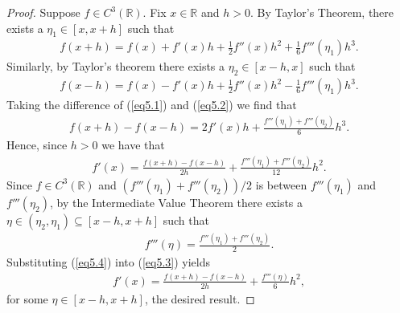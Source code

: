 \documentclass[8pt]{article}
\theoremstyle{definition}
\begin{document}
\begin{proof}
Suppose $f \in C^3 (\mathbb{R})$. Fix $x \in \mathbb{R}$ and $h > 0$. By Taylor's Theorem, there exists a $\eta_1 \in [x, x + h]$ such that
\begin{align}
f(x + h) = f(x) + f'(x) h + \frac{1}{2} f''(x) h^2 + \frac{1}{6} f'''(\eta_1) h^3. \label{eq5.1}
\end{align}
Similarly, by Taylor's theorem there exists a $\eta_2 \in [x - h, x]$ such that 
\begin{align}
f(x - h) = f(x) - f'(x) h + \frac{1}{2} f''(x) h^2 - \frac{1}{6} f'''(\eta_1) h^3. \label{eq5.2}
\end{align}
Taking the difference of (\ref{eq5.1}) and (\ref{eq5.2}) we find that 
\begin{align*}
f(x + h) - f(x - h) = 2 f'(x) h + \frac{f'''(\eta_1) + f'''(\eta_2)}{6} h^3.
\end{align*}
Hence, since $h > 0$ we have that
\begin{align}
f'(x) = \frac{f(x + h) - f(x - h)}{2h} + \frac{f'''(\eta_1) + f'''(\eta_2)}{12} h^2. \label{eq5.3}
\end{align}
Since $f \in C^3 (\mathbb{R})$ and $(f'''(\eta_1) + f'''(\eta_2))/2$ is between $f'''(\eta_1)$ and $f'''(\eta_2)$, by the Intermediate Value Theorem there exists a $\eta \in (\eta_2, \eta_1) \subseteq [x - h, x + h]$ such that
\begin{align}
f'''(\eta) = \frac{f'''(\eta_1) + f'''(\eta_2)}{2}. \label{eq5.4}
\end{align}
Substituting (\ref{eq5.4}) into (\ref{eq5.3}) yields 
\begin{align}
f'(x) = \frac{f(x + h) - f(x - h)}{2h} + \frac{f'''(\eta)}{6} h^2,
\end{align}
for some $\eta \in [x - h, x + h]$, the desired result.
\end{proof}
\end{document}
